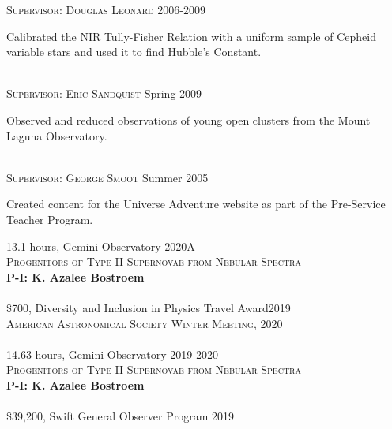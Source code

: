 \documentclass[10pt]{cv}
\begin{document}
\begin{llist}
\textsc{Supervisor: Douglas Leonard} \hfill 2006-2009 \\
\begin{minipage}[l]{0.7\textwidth}\vspace{0.15cm}
Calibrated the NIR Tully-Fisher Relation with a uniform sample of Cepheid variable stars and used it to find Hubble's Constant.\\
\end{minipage}
\\
\textsc{Supervisor: Eric Sandquist} \hfill Spring 2009\\
\begin{minipage}[l]{0.7\textwidth}\vspace{0.15cm}
Observed and reduced observations of young open clusters from the Mount Laguna Observatory. \\ 
\end{minipage}
\\
\textsc{Supervisor: George Smoot} \hfill Summer 2005\\
\begin{minipage}[l]{0.7\textwidth}\vspace{0.15cm}
Created content for the Universe Adventure website as part of the 
Pre-Service Teacher Program.\\
\end{minipage}
\vspace{-0.1in}
13.1 hours, Gemini Observatory \hfill 2020A\\
\textsc{Progenitors of Type II Supernovae from Nebular Spectra}\\
\textbf{P-I: K. Azalee Bostroem}\\
\\   
\$700, Diversity and Inclusion in Physics Travel Award\hfill 2019\\
\textsc{American Astronomical Society Winter Meeting, 2020}\\
\\
14.63 hours, Gemini Observatory \hfill 2019-2020\\
\textsc{Progenitors of Type II Supernovae from Nebular Spectra}\\
\textbf{P-I: K. Azalee Bostroem}\\
\\
\$39,200, Swift General Observer Program \hfill 2019\\

\end{llist}
\end{document}
